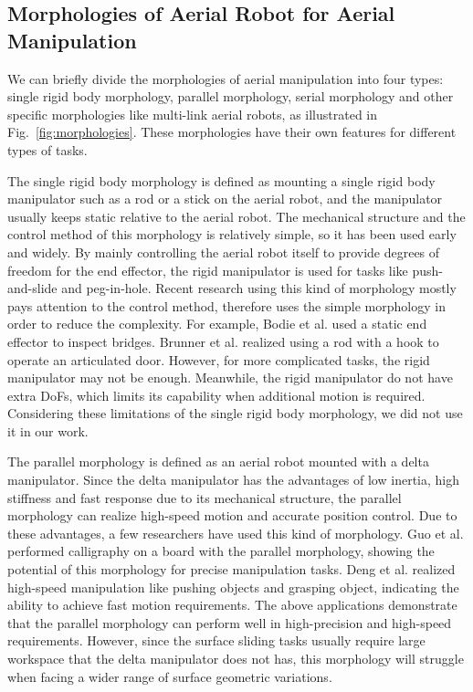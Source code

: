 \subsection{Morphologies of Aerial Robot for Aerial Manipulation}
We can briefly divide the morphologies of aerial manipulation into four types: single rigid body morphology, parallel morphology, serial morphology and other specific morphologies like multi-link aerial robots, as illustrated in Fig.~\ref{fig:morphologies}. These morphologies have their own features for different types of tasks.

The single rigid body morphology is defined as mounting a single rigid body manipulator such as a rod or a stick on the aerial robot, and the manipulator usually keeps static relative to the aerial robot. The mechanical structure and the control method of this morphology is relatively simple, so it has been used early and widely.
By mainly controlling the aerial robot itself to provide degrees of freedom for the end effector, the rigid manipulator is used for tasks like push-and-slide and peg-in-hole. 
Recent research using this kind of morphology mostly pays attention to the control method, therefore uses the simple morphology in order to reduce the complexity. For example, Bodie et al. \cite{bodie_2020_active} used a static end effector to inspect bridges. Brunner et al. \cite{brunner_2022_planning} realized using a rod with a hook to operate an articulated door. 
However, for more complicated tasks, the rigid manipulator may not be enough. Meanwhile, the rigid manipulator do not have extra DoFs, which limits its capability when additional motion is required. Considering these limitations of the single rigid body morphology, we did not use it in our work.


The parallel morphology is defined as an aerial robot mounted with a delta manipulator. Since the delta manipulator has the advantages of low inertia, high stiffness and fast response due to its mechanical structure, the parallel morphology can realize high-speed motion and accurate position control. 
Due to these advantages, a few researchers have used this kind of morphology. Guo et al. \cite{guo_2024_flying} performed calligraphy on a board with the parallel morphology, showing the potential of this morphology for precise manipulation tasks. Deng et al. \cite{deng_2025_whole} realized high-speed manipulation like pushing objects and grasping object, indicating the ability to achieve fast motion requirements.
The above applications demonstrate that the parallel morphology can perform well in high-precision and high-speed requirements. However, since the surface sliding tasks usually require large workspace that the delta manipulator does not has, this morphology will struggle when facing a wider range of surface geometric variations.

